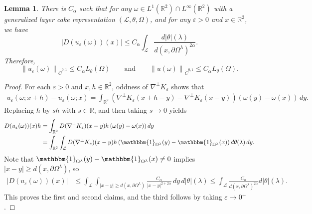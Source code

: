 \documentclass[reqno,centertags,12pt]{amsart}
\newtheorem{lemma}[theorem]{Lemma}
\theoremstyle{definition}
\numberwithin{equation}{section}
\newcommand{\abs}[1]{\left\lvert#1\right\rvert}
\newcommand{\norm}[1]{\left\|#1\right\|}
\newcommand{\bbR}{{\mathbb{R}}}
\newcommand{\eps}{\varepsilon}
\newcommand{\tht}{\theta}
\begin{document}
\begin{lemma}\label{L2.1}
    There is $C_{\alpha}$ such that for any
    $\omega\in L^{1}(\bbR^{2})\cap L^{\infty}(\bbR^{2})$
    with a generalized layer cake representation $(\mathcal{L},\theta,\Omega)$, and for any
    $\eps>0$ and $x\in\bbR^{2}$, we have
    \[
        \abs{D(u_{\eps}(\omega))(x)} \leq
        C_{\alpha}\int_{\mathcal{L}}\frac{d|\theta|(\lambda)}
        {d(x,\partial\Omega^{\lambda})^{2\alpha}}.
    \]
    Therefore,
    \[
        \norm{u_\eps(\omega)}_{\dot{C}^{0,1}} \leq C_{\alpha}L_{\tht}(\Omega)
        \qquad\text{and} \qquad \norm{u(\omega)}_{\dot{C}^{0,1}} \leq C_{\alpha}L_{\tht}(\Omega).
    \]
\end{lemma}

\begin{proof}
    For each $\eps>0$ and $x,h\in\bbR^{2}$, oddness of $\nabla^{\perp}K_{\eps}$ shows that
    \begin{align*}
        u_{\eps}(\omega;x+h) - u_{\eps}(\omega;x)
        = \int_{\bbR^{2}}\left(
            \nabla^{\perp}K_{\eps}(x + h - y) - \nabla^{\perp}K_{\eps}(x - y)
        \right)
        (\omega(y) - \omega(x))\,dy.
    \end{align*}
    Replacing $h$ by $sh$ with $s\in\bbR$, and then taking $s\to 0$ yields
    \begin{align*}
        D(u_{\eps}(\omega))(x)h
        &= \int_{\bbR^{2}}
        D(\nabla^{\perp}K_{\eps})(x-y)h \,
        (\omega(y) - \omega(x))\,dy \\
        &= \int_{\bbR^{2}}\int_{\mathcal{L}}
        D(\nabla^{\perp}K_{\eps})(x-y)h
        \left(
            \mathbbm{1}_{\Omega^{\lambda}}(y)
            - \mathbbm{1}_{\Omega^{\lambda}}(x)
        \right)
        d\theta(\lambda)\,dy.
    \end{align*}
    Note that $\mathbbm{1}_{\Omega^{\lambda}}(y)
    - \mathbbm{1}_{\Omega^{\lambda}}(x) \neq 0$ implies
    $\abs{x - y} \geq d(x,\partial\Omega^{\lambda})$, so
    \begin{align*}
        \abs{D(u_{\eps}(\omega))(x)}
        &\leq \int_{\mathcal{L}}\int_{\abs{x-y} \geq d(x,\partial\Omega^{\lambda})}
        \frac{C_{\alpha}}{\abs{x - y}^{2+2\alpha}}\,dy\,d|\theta|(\lambda)
        \leq \int_{\mathcal{L}}\frac{C_{\alpha}}
        {d(x,\partial\Omega^{\lambda})^{2\alpha}}d|\theta|(\lambda).
    \end{align*}
   This proves the first and second claims, and the third follows by taking 
   $\eps\to 0^{+}$.
\end{proof}
\end{document}
